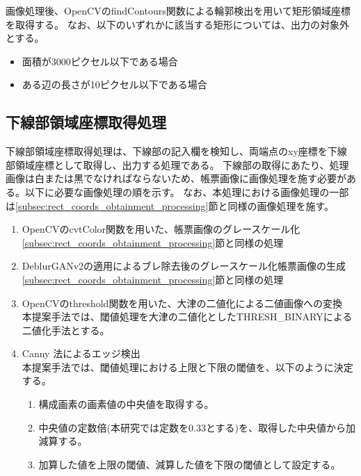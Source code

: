 画像処理後、OpenCVのfindContours関数による輪郭検出を用いて矩形領域座標を取得する。
なお、以下のいずれかに該当する矩形については、出力の対象外とする。

\begin{itemize}
    \item 面積が3000ピクセル以下である場合
    \item ある辺の長さが10ピクセル以下である場合
\end{itemize}


\subsection{下線部領域座標取得処理}\label{subsec:underline_coords_obtainment_processing}
下線部領域座標取得処理は、下線部の記入欄を検知し、両端点のxy座標を下線部領域座標として取得し、出力する処理である。
下線部の取得にあたり、処理画像は白または黒でなければならないため、帳票画像に画像処理を施す必要がある。以下に必要な画像処理の順を示す。
なお、本処理における画像処理の一部は\ref{subsec:rect_coords_obtainment_processing}節と同様の画像処理を施す。

\begin{enumerate}
    \item OpenCVのcvtColor関数を用いた、帳票画像のグレースケール化\\
        \ref{subsec:rect_coords_obtainment_processing}節と同様の処理
    \item DeblurGANv2の適用によるブレ除去後のグレースケール化帳票画像の生成\\
        \ref{subsec:rect_coords_obtainment_processing}節と同様の処理
    \item OpenCVのthreshold関数を用いた、大津の二値化による二値画像への変換\\
        本提案手法では、閾値処理を大津の二値化としたTHRESH\_BINARYによる二値化手法とする。
    \item Canny 法によるエッジ検出\\
        本提案手法では、閾値処理における上限と下限の閾値を、以下のように決定する。
        \begin{enumerate}
            \item 構成画素の画素値の中央値を取得する。
            \item 中央値の定数倍(本研究では定数を0.33とする)を、取得した中央値から加減算する。
            \item 加算した値を上限の閾値、減算した値を下限の閾値として設定する。
        \end{enumerate}
\end{enumerate}

